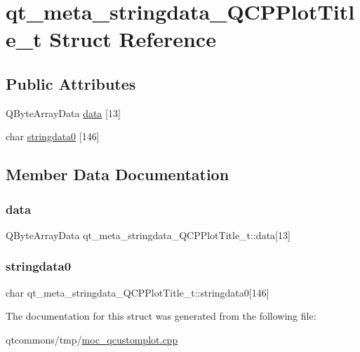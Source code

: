 \hypertarget{structqt__meta__stringdata___q_c_p_plot_title__t}{}\section{qt\+\_\+meta\+\_\+stringdata\+\_\+\+Q\+C\+P\+Plot\+Title\+\_\+t Struct Reference}
\label{structqt__meta__stringdata___q_c_p_plot_title__t}
\subsection*{Public Attributes}
\begin{DoxyCompactItemize}
\item 
Q\+Byte\+Array\+Data \mbox{\hyperlink{structqt__meta__stringdata___q_c_p_plot_title__t_a151d2ff83651494e786eb2dd220c590f}{data}} \mbox{[}13\mbox{]}
\item 
char \mbox{\hyperlink{structqt__meta__stringdata___q_c_p_plot_title__t_ad2fa4050a2618fb2888f22bdb2357776}{stringdata0}} \mbox{[}146\mbox{]}
\end{DoxyCompactItemize}


\subsection{Member Data Documentation}
\mbox{\label{structqt__meta__stringdata___q_c_p_plot_title__t_a151d2ff83651494e786eb2dd220c590f}} 
\subsubsection{\texorpdfstring{data}{data}}
{\footnotesize\ttfamily Q\+Byte\+Array\+Data qt\+\_\+meta\+\_\+stringdata\+\_\+\+Q\+C\+P\+Plot\+Title\+\_\+t\+::data\mbox{[}13\mbox{]}}

\mbox{\label{structqt__meta__stringdata___q_c_p_plot_title__t_ad2fa4050a2618fb2888f22bdb2357776}} 
\subsubsection{\texorpdfstring{stringdata0}{stringdata0}}
{\footnotesize\ttfamily char qt\+\_\+meta\+\_\+stringdata\+\_\+\+Q\+C\+P\+Plot\+Title\+\_\+t\+::stringdata0\mbox{[}146\mbox{]}}



The documentation for this struct was generated from the following file\+:\begin{DoxyCompactItemize}
\item 
qtcommons/tmp/\mbox{\hyperlink{moc__qcustomplot_8cpp}{moc\+\_\+qcustomplot.\+cpp}}\end{DoxyCompactItemize}
